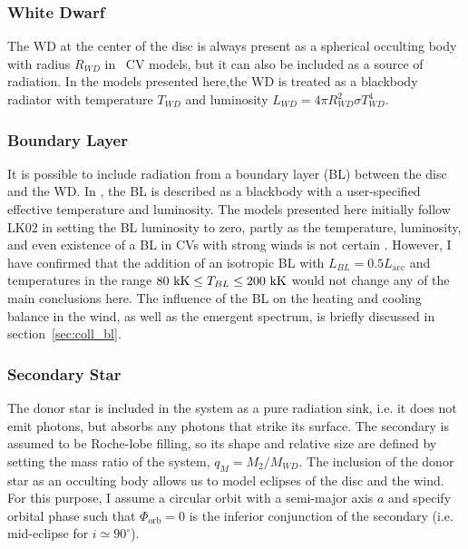 \subsubsection{White Dwarf}

The WD at the center of the disc is always present as a spherical occulting
body with radius $R_{WD}$ in \py\ CV models, but it can also be included
as a source of radiation. In the models presented here,the
WD is treated as a blackbody radiator with temperature $T_{WD}$ and luminosity
$L_{WD} = 4\pi R_{WD}^2 \sigma T_{WD}^4$. 

\subsubsection{Boundary Layer}

It is possible to include radiation from a boundary layer (BL) between
the disc and the WD. In \py, the BL is described as
a blackbody with a user-specified effective temperature and
luminosity. The models presented here initially follow LK02 in setting
the BL luminosity to zero, partly as the temperature, luminosity, and even
existence of a BL in CVs with strong winds is not certain \citep{hoaredrew1993}.
However, I have confirmed that the addition 
of an isotropic BL with $L_{BL} = 0.5 L_{\mathrm{acc}}$ and temperatures in 
the range $80~{\rm kK} \leq T_{BL} \leq 200~{\rm kK}$ would not change 
any of the main conclusions here. 
The influence of the BL on the heating and cooling balance
in the wind, as well as the emergent spectrum, is briefly discussed in
section~\ref{sec:coll_bl}.


\subsubsection{Secondary Star}

The donor star is included in the system as a pure radiation sink, 
i.e. it does not emit photons, but absorbs any photons that strike its
surface. The secondary is assumed to be Roche-lobe filling, so its
shape and relative size are defined by setting the mass ratio of the system, 
$q_M = M_2/M_{WD}$. The inclusion of the donor star as an occulting body
allows us to model eclipses of the disc and the wind. For this
purpose, I assume a circular orbit with a semi-major axis $a$ and 
specify orbital phase such that $\Phi_{\mathrm{orb}} = 0$ is the
inferior conjunction of the secondary (i.e. mid-eclipse for $i \simeq
90^\circ$).




